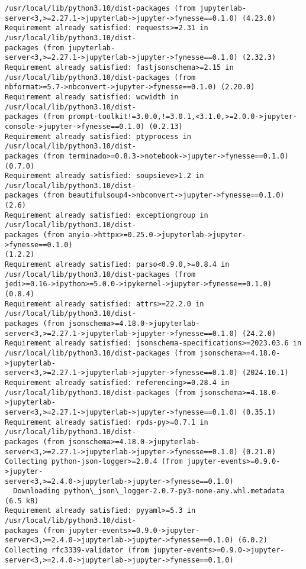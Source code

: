 \documentclass[11pt]{article}
\begin{document}
\begin{Verbatim}[commandchars=\\\{\}]
/usr/local/lib/python3.10/dist-packages (from jupyterlab-
server<3,>=2.27.1->jupyterlab->jupyter->fynesse==0.1.0) (4.23.0)
Requirement already satisfied: requests>=2.31 in /usr/local/lib/python3.10/dist-
packages (from jupyterlab-
server<3,>=2.27.1->jupyterlab->jupyter->fynesse==0.1.0) (2.32.3)
Requirement already satisfied: fastjsonschema>=2.15 in
/usr/local/lib/python3.10/dist-packages (from
nbformat>=5.7->nbconvert->jupyter->fynesse==0.1.0) (2.20.0)
Requirement already satisfied: wcwidth in /usr/local/lib/python3.10/dist-
packages (from prompt-toolkit!=3.0.0,!=3.0.1,<3.1.0,>=2.0.0->jupyter-
console->jupyter->fynesse==0.1.0) (0.2.13)
Requirement already satisfied: ptyprocess in /usr/local/lib/python3.10/dist-
packages (from terminado>=0.8.3->notebook->jupyter->fynesse==0.1.0) (0.7.0)
Requirement already satisfied: soupsieve>1.2 in /usr/local/lib/python3.10/dist-
packages (from beautifulsoup4->nbconvert->jupyter->fynesse==0.1.0) (2.6)
Requirement already satisfied: exceptiongroup in /usr/local/lib/python3.10/dist-
packages (from anyio->httpx>=0.25.0->jupyterlab->jupyter->fynesse==0.1.0)
(1.2.2)
Requirement already satisfied: parso<0.9.0,>=0.8.4 in
/usr/local/lib/python3.10/dist-packages (from
jedi>=0.16->ipython>=5.0.0->ipykernel->jupyter->fynesse==0.1.0) (0.8.4)
Requirement already satisfied: attrs>=22.2.0 in /usr/local/lib/python3.10/dist-
packages (from jsonschema>=4.18.0->jupyterlab-
server<3,>=2.27.1->jupyterlab->jupyter->fynesse==0.1.0) (24.2.0)
Requirement already satisfied: jsonschema-specifications>=2023.03.6 in
/usr/local/lib/python3.10/dist-packages (from jsonschema>=4.18.0->jupyterlab-
server<3,>=2.27.1->jupyterlab->jupyter->fynesse==0.1.0) (2024.10.1)
Requirement already satisfied: referencing>=0.28.4 in
/usr/local/lib/python3.10/dist-packages (from jsonschema>=4.18.0->jupyterlab-
server<3,>=2.27.1->jupyterlab->jupyter->fynesse==0.1.0) (0.35.1)
Requirement already satisfied: rpds-py>=0.7.1 in /usr/local/lib/python3.10/dist-
packages (from jsonschema>=4.18.0->jupyterlab-
server<3,>=2.27.1->jupyterlab->jupyter->fynesse==0.1.0) (0.21.0)
Collecting python-json-logger>=2.0.4 (from jupyter-events>=0.9.0->jupyter-
server<3,>=2.4.0->jupyterlab->jupyter->fynesse==0.1.0)
  Downloading python\_json\_logger-2.0.7-py3-none-any.whl.metadata (6.5 kB)
Requirement already satisfied: pyyaml>=5.3 in /usr/local/lib/python3.10/dist-
packages (from jupyter-events>=0.9.0->jupyter-
server<3,>=2.4.0->jupyterlab->jupyter->fynesse==0.1.0) (6.0.2)
Collecting rfc3339-validator (from jupyter-events>=0.9.0->jupyter-
server<3,>=2.4.0->jupyterlab->jupyter->fynesse==0.1.0)

\end{Verbatim}
\end{document}
